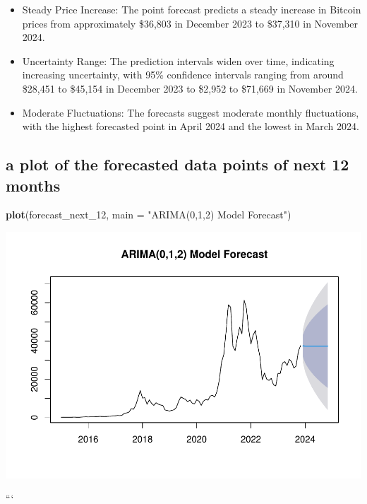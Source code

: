 \documentclass[
]{book}
\newenvironment{Shaded}{\begin{snugshade}}{\end{snugshade}}
\newcommand{\AttributeTok}[1]{\textcolor[rgb]{0.13,0.29,0.53}{#1}}
\newcommand{\FunctionTok}[1]{\textcolor[rgb]{0.13,0.29,0.53}{\textbf{#1}}}
\newcommand{\NormalTok}[1]{#1}
\newcommand{\StringTok}[1]{\textcolor[rgb]{0.31,0.60,0.02}{#1}}
\providecommand{\tightlist}{%
  \setlength{\itemsep}{0pt}\setlength{\parskip}{0pt}}
\begin{document}
\begin{itemize}
\tightlist
\item
  Steady Price Increase: The point forecast predicts a steady increase in Bitcoin prices from approximately \$36,803 in December 2023 to \$37,310 in November 2024.
\item
  Uncertainty Range: The prediction intervals widen over time, indicating increasing uncertainty, with 95\% confidence intervals ranging from around \$28,451 to \$45,154 in December 2023 to \$2,952 to \$71,669 in November 2024.
\item
  Moderate Fluctuations: The forecasts suggest moderate monthly fluctuations, with the highest forecasted point in April 2024 and the lowest in March 2024.
\end{itemize}

\subsection{a plot of the forecasted data points of next 12 months}\label{a-plot-of-the-forecasted-data-points-of-next-12-months}

\begin{Shaded}
\begin{Highlighting}[]
\FunctionTok{plot}\NormalTok{(forecast\_next\_12, }\AttributeTok{main =} \StringTok{"ARIMA(0,1,2) Model Forecast"}\NormalTok{)}
\end{Highlighting}
\end{Shaded}

\includegraphics{bookdown-demo_files/figure-latex/unnamed-chunk-55-1.pdf}

```
\end{document}
